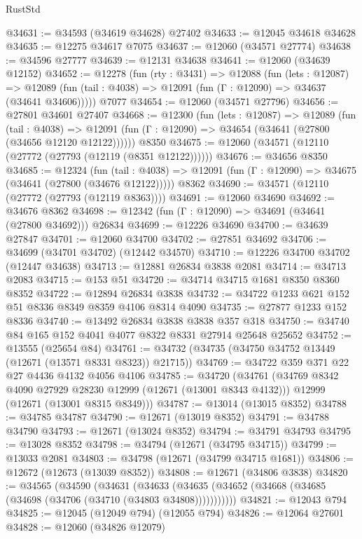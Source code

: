 \begin{lexlean}{RustStd}
\begin{coremodule}
@34631 := @34593 (@34619 @34628) @27402
@34633 := @12045 @34618 @34628
@34635 := @12275 @34617 @7075
@34637 := @12060 (@34571 @27774)
@34638 := @34596 @27777
@34639 := @12131 @34638
@34641 := @12060 (@34639 @12152)
@34652 := @12278
    (fun (rty : @3431) =>
    @12088
      (fun (lets : @12087) =>
      @12089 (fun (tail : @4038) => @12091 (fun (Γ : @12090) => @34637 (@34641 @34606)))))
    @7077
@34654 := @12060 (@34571 @27796)
@34656 := @27801 @34601 @27407
@34668 := @12300
    (fun (lets : @12087) =>
    @12089
      (fun (tail : @4038) =>
      @12091 (fun (Γ : @12090) => @34654 (@34641 (@27800 (@34656 @12120 @12122))))))
    @8350
@34675 := @12060 (@34571 (@12110 (@27772 (@27793 (@12119 (@8351 @12122))))))
@34676 := @34656 @8350
@34685 := @12324
    (fun (tail : @4038) => @12091 (fun (Γ : @12090) => @34675 (@34641 (@27800 (@34676 @12122)))))
    @8362
@34690 := @34571 (@12110 (@27772 (@27793 (@12119 @8363))))
@34691 := @12060 @34690
@34692 := @34676 @8362
@34698 := @12342 (fun (Γ : @12090) => @34691 (@34641 (@27800 @34692))) @26834
@34699 := @12226 @34690
@34700 := @34639 @27847
@34701 := @12060 @34700
@34702 := @27851 @34692
@34706 := @34699 (@34701 @34702) (@12442 @34570)
@34710 := @12226 @34700 @34702 (@12447 @34638)
@34713 := @12881 @26834 @3838 @2081
@34714 := @34713 @2083
@34715 := @153 @51
@34720 := @34714 @34715 @1681 @8350 @8360 @8352
@34722 := @12894 @26834 @3838
@34732 := @34722 @1233 @621 @152 @51 @8336 @8349 @8359 @4106 @8314 @4090
@34735 := @27877 @1233 @152 @8336
@34740 := @13492 @26834 @3838 @3838 @357 @318
@34750 := @34740 @84 @165 @152 @4041 @4077 @8322 @8331 @27914 @25648 @25652
@34752 := @13555 (@25654 @84)
@34761 := @34732 (@34735 (@34750 @34752 @13449 (@12671 (@13571 @8331 @8323)) @21715))
@34769 := @34722 @359 @371 @22 @27 @4436 @4132 @4056 @4106
@34785 := @34720
    (@34761
      (@34769 @8342 @4090 @27929 @28230 @12999 (@12671 (@13001 @8343 @4132)))
      @12999
      (@12671 (@13001 @8315 @8349)))
@34787 := @13014 (@13015 @8352)
@34788 := @34785 @34787
@34790 := @12671 (@13019 @8352)
@34791 := @34788 @34790
@34793 := @12671 (@13024 @8352)
@34794 := @34791 @34793
@34795 := @13028 @8352
@34798 := @34794 (@12671 (@34795 @34715))
@34799 := @13033 @2081
@34803 := @34798 (@12671 (@34799 @34715 @1681))
@34806 := @12672 (@12673 (@13039 @8352))
@34808 := @12671 (@34806 @3838)
@34820 := @34565
    (@34590
      (@34631
        (@34633 (@34635 (@34652 (@34668 (@34685 (@34698 (@34706 (@34710 (@34803 @34808)))))))))))
@34821 := @12043 @794
@34825 := @12045 (@12049 @794) (@12055 @794)
@34826 := @12064 @27601
@34828 := @12060 (@34826 @12079)

\end{coremodule}
\end{lexlean}
